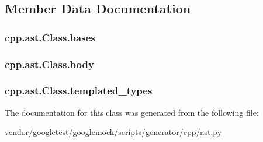 \subsection{Member Data Documentation}
\subsubsection[{\texorpdfstring{bases}{bases}}]{\setlength{\rightskip}{0pt plus 5cm}cpp.\+ast.\+Class.\+bases}\hypertarget{classcpp_1_1ast_1_1Class_a5665eb67314a075d4e0ff91accbde5d1}{}\label{classcpp_1_1ast_1_1Class_a5665eb67314a075d4e0ff91accbde5d1}
\subsubsection[{\texorpdfstring{body}{body}}]{\setlength{\rightskip}{0pt plus 5cm}cpp.\+ast.\+Class.\+body}\hypertarget{classcpp_1_1ast_1_1Class_add39f61fdcf6dae42d79cac3dcbb7782}{}\label{classcpp_1_1ast_1_1Class_add39f61fdcf6dae42d79cac3dcbb7782}
\subsubsection[{\texorpdfstring{templated\+\_\+types}{templated_types}}]{\setlength{\rightskip}{0pt plus 5cm}cpp.\+ast.\+Class.\+templated\+\_\+types}\hypertarget{classcpp_1_1ast_1_1Class_a48ed0d3115656554d9134bc1787390fa}{}\label{classcpp_1_1ast_1_1Class_a48ed0d3115656554d9134bc1787390fa}


The documentation for this class was generated from the following file\+:\begin{DoxyCompactItemize}
\item 
vendor/googletest/googlemock/scripts/generator/cpp/\hyperlink{ast_8py}{ast.\+py}\end{DoxyCompactItemize}
